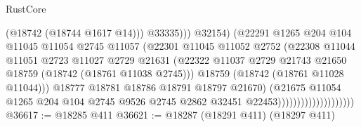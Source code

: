 \begin{lexlean}{RustCore}
\begin{coremodule}
                                                  (@18742 (@18744 @1617 @14)))
                                                @33335)))
                                          @32154)
                                        (@22291
                                          @1265
                                          @204
                                          @104
                                          @11045
                                          @11054
                                          @2745
                                          @11057
                                          (@22301
                                            @11045
                                            @11052
                                            @2752
                                            (@22308
                                              @11044
                                              @11051
                                              @2723
                                              @11027
                                              @2729
                                              @21631
                                              (@22322
                                                @11037
                                                @2729
                                                @21743
                                                @21650
                                                @18759
                                                (@18742 (@18761 @11038 @2745)))
                                              @18759
                                              (@18742 (@18761 @11028 @11044)))
                                            @18777
                                            @18781
                                            @18786
                                            @18791
                                            @18797
                                            @21670)
                                          (@21675
                                            @11054
                                            @1265
                                            @204
                                            @104
                                            @2745
                                            @9526
                                            @2745
                                            @2862
                                            @32451
                                            @22453))))))))))))))))))))
@36617 := @18285 @411
@36621 := @18287 (@18291 @411) (@18297 @411)

\end{coremodule}
\end{lexlean}
